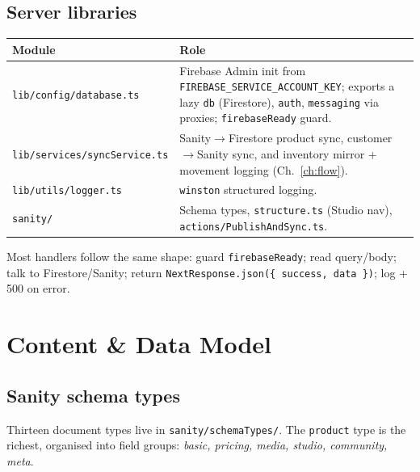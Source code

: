 \documentclass[11pt,a4paper]{report}
\newcommand{\code}[1]{\texttt{#1}}
\begin{document}
\section{Server libraries}
\begin{center}\small
\begin{tabular}{@{}p{5.2cm}p{8.7cm}@{}}
\toprule
\textbf{Module} & \textbf{Role}\\
\midrule
\code{lib/config/database.ts} & Firebase Admin init from \code{FIREBASE\_SERVICE\_ACCOUNT\_KEY}; exports a lazy \code{db} (Firestore), \code{auth}, \code{messaging} via proxies; \code{firebaseReady} guard.\\
\code{lib/services/syncService.ts} & Sanity$\rightarrow$Firestore product sync, customer$\rightarrow$Sanity sync, and inventory mirror + movement logging (Ch.~\ref{ch:flow}).\\
\code{lib/utils/logger.ts} & \code{winston} structured logging.\\
\code{sanity/} & Schema types, \code{structure.ts} (Studio nav), \code{actions/PublishAndSync.ts}.\\
\bottomrule
\end{tabular}
\end{center}

\noindent Most handlers follow the same shape: guard \code{firebaseReady}; read query/body;
talk to Firestore/Sanity; return \code{NextResponse.json(\{ success, data \})}; log + 500 on error.

\chapter{Content \& Data Model}\label{ch:data}

\section{Sanity schema types}
Thirteen document types live in \code{sanity/schemaTypes/}. The \code{product} type is the
richest, organised into field groups: \emph{basic, pricing, media, studio, community, meta}.
\end{document}
